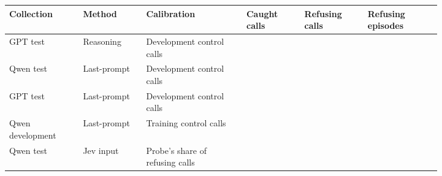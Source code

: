 \begin{tabular}{@{}>{\raggedright\arraybackslash}p{0.14\linewidth}>{\raggedright\arraybackslash}p{0.12\linewidth}>{\raggedright\arraybackslash}p{0.19\linewidth}>{\raggedright\arraybackslash}p{0.11\linewidth}>{\raggedright\arraybackslash}p{0.12\linewidth}>{\raggedright\arraybackslash}p{0.14\linewidth}@{}}
\toprule
Collection & Method & Calibration & Caught calls & Refusing calls & Refusing episodes \\
\midrule
GPT test & Reasoning & Development control calls & \gptFreshAlarmZero{} & \gptFreshAlarmOne{} & \gptFreshAlarmTwo{} \\
Qwen test & Last-prompt & Development control calls & \qwenFreshAlarmZero{} & \qwenFreshAlarmOne{} & \qwenFreshAlarmTwo{} \\
GPT test & Last-prompt & Development control calls & \gptossFreshAlarmZero{} & \gptossFreshAlarmOne{} & \gptossFreshAlarmTwo{} \\
Qwen development & Last-prompt & Training control calls & \qwenDevAlarmProbeZero{} & \qwenDevAlarmProbeOne{} & \qwenDevAlarmProbeTwo{} \\
Qwen test & Jev input & Probe's share of refusing calls & \qwenMatchedJevCaught{} & \qwenMatchedJevRefusing{} & \qwenJevCalibrationMatchedRefusingEpisodesRate{} \\
\bottomrule
\end{tabular}
